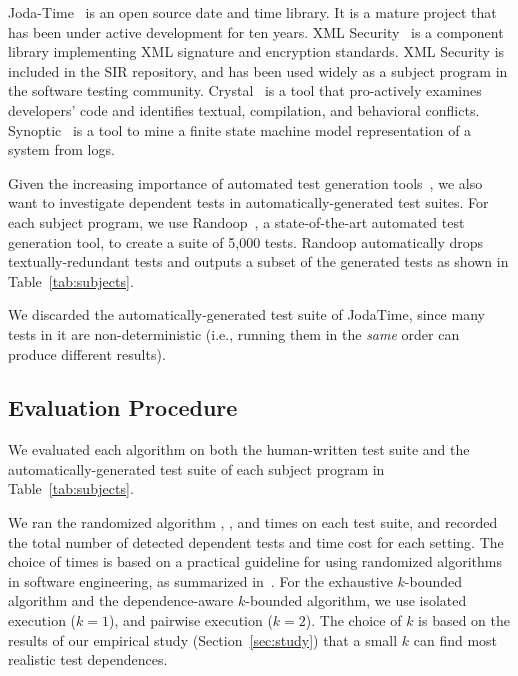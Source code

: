 Joda-Time~\cite{jodatime} is an open source
date and time library. It is a mature project that
has been under active development
for ten years. XML Security~\cite{xmlsecurity}
is a component library implementing XML signature and encryption
standards. XML Security is included in
the SIR repository, and has been used widely
as a subject program in the software testing community.
Crystal~\cite{crystal} is a tool that
pro-actively examines developers' code and
identifies textual, compilation, and behavioral conflicts.
Synoptic~\cite{synoptic} is a tool to mine a finite state
machine model representation of a system from logs.

Given the increasing importance of automated test generation
tools~\cite{PachecoLET2007, ZhangSBE2011, Csallner:2004, fraseretal:ISSTA:2011},
we also want to investigate dependent tests in automatically-generated
test suites. For each subject program, we use
Randoop~\cite{PachecoLET2007}, a state-of-the-art automated
test generation tool, to create a suite of 5,000 tests.
Randoop automatically drops textually-redundant tests 
and outputs a subset of the generated tests as
shown in Table~\ref{tab:subjects}.

We discarded the automatically-generated test suite of
JodaTime, since many tests in it are non-deterministic (i.e., 
running them in the \textit{same} order
can produce different results).


\subsection{Evaluation Procedure}

We evaluated each algorithm 
on both the human-written test suite 
and the automatically-generated test suite
of each subject program in Table~\ref{tab:subjects}.


We ran the randomized algorithm \smalltrialnum, \mediumtrialnum,
and \trialnum times on each test suite, and recorded
the total number of detected dependent tests and time cost
for each setting. The choice of \trialnum times is based
on a practical guideline for using randomized algorithms
in software engineering, as summarized in~\cite{Arcuri:2011}.
%
For the exhaustive $k$-bounded algorithm
and the dependence-aware $k$-bounded algorithm,
we use isolated execution ($k = 1$), and
pairwise execution ($k = 2$). The choice of $k$ is
based on the results of our empirical
study (Section~\ref{sec:study}) that a small $k$
can find most realistic test dependences.

